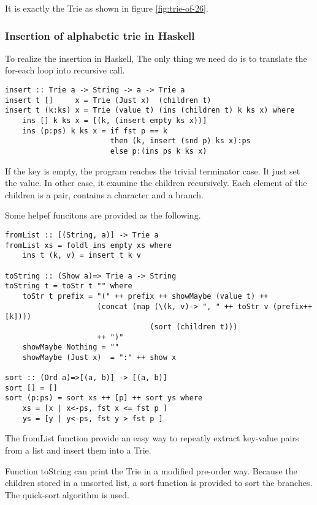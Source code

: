 \documentclass{article}
\begin{document}
It is exactly the Trie as shown in figure \ref{fig:trie-of-26}.

\subsubsection*{Insertion of alphabetic trie in Haskell}
To realize the insertion in Haskell, The only thing we need do is
to translate the for-each loop into recursive call. 

\lstset{language=Haskell}
\begin{lstlisting}
insert :: Trie a -> String -> a -> Trie a
insert t []     x = Trie (Just x)  (children t)
insert t (k:ks) x = Trie (value t) (ins (children t) k ks x) where
    ins [] k ks x = [(k, (insert empty ks x))]
    ins (p:ps) k ks x = if fst p == k 
                        then (k, insert (snd p) ks x):ps
                        else p:(ins ps k ks x)
\end{lstlisting}

If the key is empty, the program reaches the trivial terminator case.
It just set the value. In other case, it examine the children recursively.
Each element of the children is a pair, contains a character and
a branch. 

Some helpef funcitons are provided as the following.

\begin{lstlisting}
fromList :: [(String, a)] -> Trie a
fromList xs = foldl ins empty xs where
    ins t (k, v) = insert t k v

toString :: (Show a)=> Trie a -> String
toString t = toStr t "" where
    toStr t prefix = "(" ++ prefix ++ showMaybe (value t) ++ 
                     (concat (map (\(k, v)-> ", " ++ toStr v (prefix++[k])))
                                 (sort (children t)))
                     ++ ")"
    showMaybe Nothing = ""
    showMaybe (Just x)  = ":" ++ show x

sort :: (Ord a)=>[(a, b)] -> [(a, b)]
sort [] = []
sort (p:ps) = sort xs ++ [p] ++ sort ys where
    xs = [x | x<-ps, fst x <= fst p ]
    ys = [y | y<-ps, fst y > fst p ]
\end{lstlisting}

The fromList function provide an easy way to repeatly extract
key-value pairs from a list and insert them into a Trie.

Function toString can print the Trie in a modified pre-order way.
Because the children stored in a unsorted list, a sort function is
provided to sort the branches. The quick-sort algorithm is used.
\end{document}
